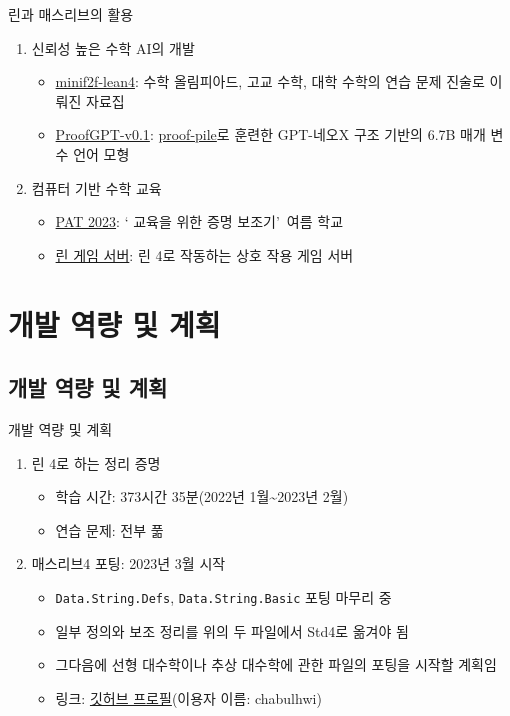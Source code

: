 \documentclass{beamer}
\begin{document}
\begin{frame}{린과 매스리브의 활용}
  \begin{enumerate}
    \item 신뢰성 높은 수학 AI의 개발
    \begin{itemize}
      \item \href{https://huggingface.co/datasets/hoskinson-center/minif2f-lean4}{minif2f-lean4}:
            수학 올림피아드, 고교 수학, 대학 수학의 연습 문제 진술로 이뤄진
            자료집
      \item \href{https://huggingface.co/hoskinson-center/proofGPT-v0.1-6.7B}{ProofGPT-v0.1}:
            \href{https://huggingface.co/datasets/hoskinson-center/proof-pile}{proof-pile}로
            훈련한 GPT-네오X 구조 기반의 6.7B 매개 변수 언어 모형
    \end{itemize}
    \item 컴퓨터 기반 수학 교육
    \begin{itemize}
      \item \href{https://pat2023.icube.unistra.fr/}{PAT 2023}: \textquoteleft
            교육을 위한 증명 보조기\textquoteright\ 여름 학교
      \item \href{https://adam.math.hhu.de/}{린 게임 서버}: 린 4로 작동하는 상호
            작용 게임 서버
    \end{itemize}
  \end{enumerate}
\end{frame}

\section{개발 역량 및 계획}

\subsection{개발 역량 및 계획}

\begin{frame}[fragile]{개발 역량 및 계획}
  \begin{enumerate}
    \item 린 4로 하는 정리 증명 \autocite{tpil4}
    \begin{itemize}
      \item 학습 시간: 373시간 35분(2022년 1월\textasciitilde2023년 2월)
      \item 연습 문제: 전부 풂
    \end{itemize}
    \item 매스리브4 포팅: 2023년 3월 시작
    \begin{itemize}
      \item \verb|Data.String.Defs|, \verb|Data.String.Basic| 포팅 마무리 중
      \item 일부 정의와 보조 정리를 위의 두 파일에서 Std4로 옮겨야 됨
      \item 그다음에 선형 대수학이나 추상 대수학에 관한 파일의 포팅을 시작할 계획임
      \item 링크: \href{https://github.com/chabulhwi/}{깃허브 프로필}(이용자 이름:
      chabulhwi)
    \end{itemize}
  \end{enumerate}
\end{frame}
\end{document}
